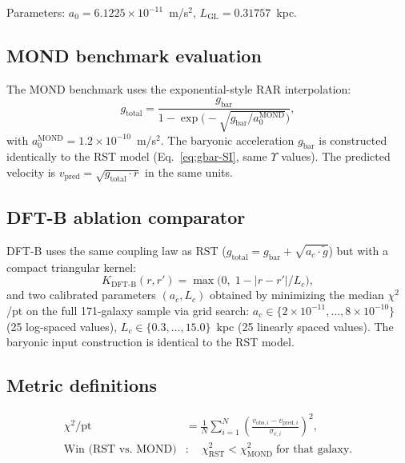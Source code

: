\documentclass[11pt,a4paper]{article}
\begin{document}
Parameters: $a_0 = 6.1225 \times 10^{-11}$~m/s$^2$, $L_{\mathrm{GL}} = 0.31757$~kpc.

\subsection{MOND benchmark evaluation}

The MOND benchmark uses the exponential-style RAR interpolation:
\begin{equation}
\label{eq:mond-alg}
g_{\mathrm{total}} = \frac{g_{\mathrm{bar}}}{1 - \exp\!\bigl(-\!\sqrt{g_{\mathrm{bar}} / a_0^{\mathrm{MOND}}}\bigr)},
\end{equation}
with $a_0^{\mathrm{MOND}} = 1.2 \times 10^{-10}$~m/s$^2$.
The baryonic acceleration $g_{\mathrm{bar}}$ is constructed identically to the RST model (Eq.~\ref{eq:gbar-SI}, same $\Upsilon$ values).
The predicted velocity is $v_{\mathrm{pred}} = \sqrt{g_{\mathrm{total}} \cdot r}$ in the same units.

\subsection{DFT-B ablation comparator}

DFT-B uses the same coupling law as RST ($g_{\mathrm{total}} = g_{\mathrm{bar}} + \sqrt{a_c \cdot \tilde{g}}$) but with a compact triangular kernel:
\begin{equation}
K_{\mathrm{DFT\text{-}B}}(r, r') = \max\!\bigl(0,\; 1 - |r - r'|/L_c\bigr),
\end{equation}
and two calibrated parameters $(a_c, L_c)$ obtained by minimizing the median $\chi^2$/pt on the full 171-galaxy sample via grid search: $a_c \in \{2 \times 10^{-11}, \ldots, 8 \times 10^{-10}\}$ (25 log-spaced values), $L_c \in \{0.3, \ldots, 15.0\}$~kpc (25 linearly spaced values).
The baryonic input construction is identical to the RST model.

\subsection{Metric definitions}

\begin{align}
\chi^2/\mathrm{pt} &= \frac{1}{N}\sum_{i=1}^{N}\left(\frac{v_{\mathrm{obs},i} - v_{\mathrm{pred},i}}{\sigma_{v,i}}\right)^{\!2}, \label{eq:chi2} \\[4pt]
\text{Win (RST vs.\ MOND)} &: \quad \chi^2_{\mathrm{RST}} < \chi^2_{\mathrm{MOND}} \;\text{for that galaxy.} \label{eq:win}
\end{align}
\end{document}
